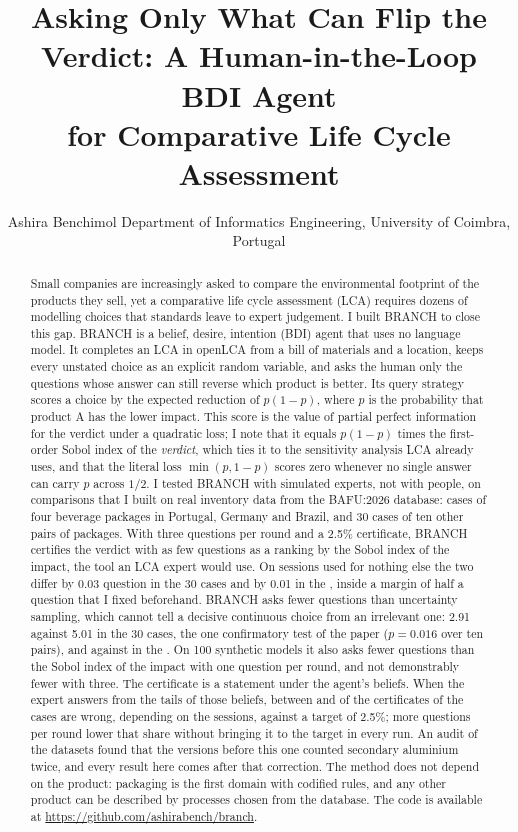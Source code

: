 \documentclass{article}
\title{Asking Only What Can Flip the Verdict: A Human-in-the-Loop BDI Agent\\
for Comparative Life Cycle Assessment}
\author{Ashira Benchimol
\affiliations
Department of Informatics Engineering, University of Coimbra, Portugal
}
\newcommand{\repo}{\url{https://github.com/ashirabench/branch}}
\begin{document}
\maketitle

\begin{abstract}
Small companies are increasingly asked to compare the environmental footprint of the products they sell,
yet a comparative life cycle assessment (LCA) requires dozens of modelling choices that standards leave
to expert judgement. I built BRANCH to close this gap. BRANCH is a belief, desire, intention (BDI) agent
that uses no language model. It completes an LCA in openLCA from a bill of materials and a location, keeps
every unstated choice as an explicit random variable, and asks the human only the questions whose answer
can still reverse which product is better. Its query strategy scores a choice by the expected reduction of
$p(1-p)$, where $p$ is the probability that product A has the lower impact. This score is the value of
partial perfect information for the verdict under a quadratic loss; I note that it equals $p(1-p)$ times
the first-order Sobol index of the \emph{verdict}, which ties it to the sensitivity analysis LCA already
uses, and that the literal loss $\min(p,1-p)$ scores zero whenever no single answer can carry $p$ across
$1/2$. I tested BRANCH with simulated experts, not with people, on comparisons that I built on real
inventory data from the BAFU:2026 database: \nCases{} cases of four beverage packages in Portugal, Germany
and Brazil, and 30 cases of ten other pairs of packages. With three questions per round and a 2.5\%
certificate, BRANCH certifies the verdict with as few questions as a ranking by the Sobol index of the
impact, the tool an LCA expert would use. On sessions used for nothing else the two differ by 0.03
question in the 30 cases and by 0.01 in the \nCases{}, inside a margin of half a question that I fixed
beforehand. BRANCH asks fewer questions than uncertainty sampling, which cannot tell a decisive continuous
choice from an irrelevant one: 2.91 against 5.01 in the 30 cases, the one confirmatory test of the paper
($p=0.016$ over ten pairs), and \qFlipChosen{} against \qEntChosen{} in the \nCases{}. On 100 synthetic
models it also asks fewer questions than the Sobol index of the impact with one question per round, and
not demonstrably fewer with three. The certificate is a statement under the agent's beliefs. When the
expert answers from the tails of those beliefs, between \wFlipHoldThree{} and \wFlipChosenTails{} of the
certificates of the \nCases{} cases are wrong, depending on the sessions, against a target of 2.5\%; more
questions per round lower that share without bringing it to the target in every run. An audit of the
datasets found that the versions before this one counted secondary aluminium twice, and every result here
comes after that correction. The method does not depend on the product: packaging is the first domain with
codified rules, and any other product can be described by processes chosen from the database. The code is
available at \repo.
\end{abstract}
\end{document}

